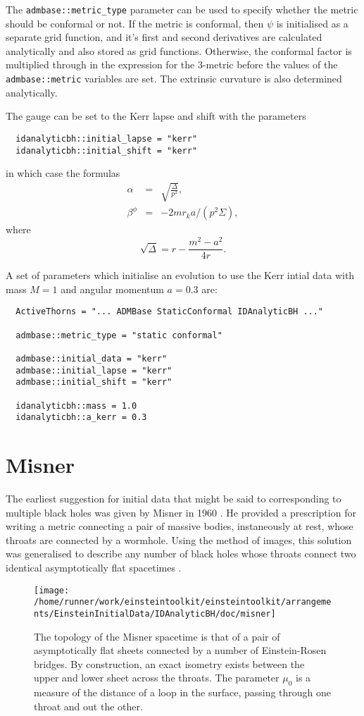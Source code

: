 \documentclass{article}
\begin{document}
The \texttt{admbase::metric\_type} parameter can be used to specify
whether the metric should be conformal or not. If the metric is
conformal, then $\psi$ is initialised as a separate grid function, and
it's first and second derivatives are calculated analytically and also
stored as grid functions. Otherwise, the conformal factor is
multiplied through in the expression for the 3-metric before the
values of the \texttt{admbase::metric} variables are set. The
extrinsic curvature is also determined analytically.

The gauge can be set to the Kerr lapse and shift with the parameters
\begin{verbatim}
  idanalyticbh::initial_lapse = "kerr"
  idanalyticbh::initial_shift = "kerr"
\end{verbatim}
in which case the formulas
\begin{eqnarray}
  \alpha & = &\sqrt{\frac{\Delta}{p^2}}, \\
  \beta^\phi & = & -2 m r_k a / (p^2 \Sigma),
\end{eqnarray}
where
\begin{equation}
  \sqrt{\Delta} = r - \frac{m^2 - a^2}{4r}.
\end{equation}

A set of parameters which initialise an evolution to use the Kerr
intial data with mass $M=1$ and angular momentum $a=0.3$ are:
\begin{verbatim}
  ActiveThorns = "... ADMBase StaticConformal IDAnalyticBH ..."

  admbase::metric_type = "static conformal"

  admbase::initial_data = "kerr"
  admbase::initial_lapse = "kerr"
  admbase::initial_shift = "kerr"

  idanalyticbh::mass = 1.0
  idanalyticbh::a_kerr = 0.3
\end{verbatim}

\section{Misner}

The earliest suggestion for initial data that might be said to
corresponding to multiple black holes was given by Misner in 1960
\cite{CactusEinstein_IDAnalyticBH_misner:1960}. He provided a prescription for writing a metric
connecting a pair of massive bodies, instaneously at rest, whose
throats are connected by a wormhole. Using the method of images, this
solution was generalised to describe any number of black holes whose
throats connect two identical asymptotically flat spacetimes
\cite{CactusEinstein_IDAnalyticBH_misner:1963}.
\begin{figure}
  \centering
  \texttt{[image: /home/runner/work/einsteintoolkit/einsteintoolkit/arrangements/EinsteinInitialData/IDAnalyticBH/doc/misner]}
  \caption{The topology of the Misner spacetime is that of a pair of
  asymptotically flat sheets connected by a number of Einstein-Rosen
  bridges. By construction, an exact isometry exists between the upper
  and lower sheet across the throats. The parameter $\mu_0$ is a
  measure of the distance of a loop in the surface, passing through
  one throat and out the other.}
\end{figure}
\end{document}
